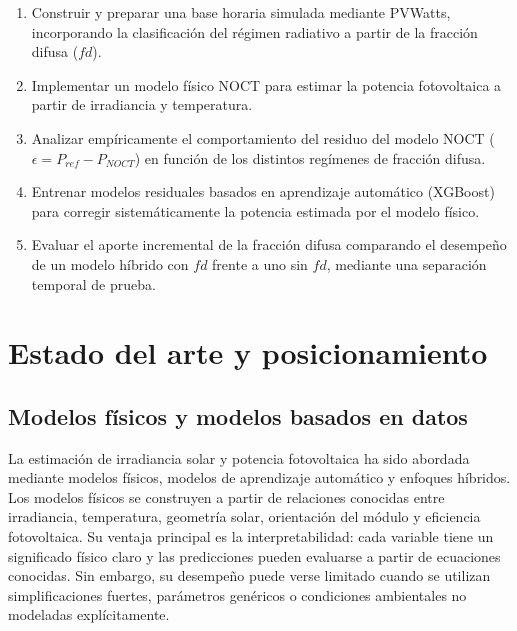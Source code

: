 \documentclass[12pt, letterpaper]{article}
\begin{document}
\begin{enumerate}
    \item Construir y preparar una base horaria simulada mediante PVWatts, incorporando la clasificaci\'on del r\'egimen radiativo a partir de la fracci\'on difusa (\(fd\)).
    \item Implementar un modelo f\'isico NOCT para estimar la potencia fotovoltaica a partir de irradiancia y temperatura.
    \item Analizar emp\'iricamente el comportamiento del residuo del modelo NOCT (\(\epsilon = P_{ref} - P_{NOCT}\)) en funci\'on de los distintos reg\'imenes de fracci\'on difusa.
    \item Entrenar modelos residuales basados en aprendizaje autom\'atico (XGBoost) para corregir sistem\'aticamente la potencia estimada por el modelo f\'isico.
    \item Evaluar el aporte incremental de la fracci\'on difusa comparando el desempe\~no de un modelo h\'ibrido con \(fd\) frente a uno sin \(fd\), mediante una separaci\'on temporal de prueba.
\end{enumerate}


\section{Estado del arte y posicionamiento}

\subsection{Modelos f\'isicos y modelos basados en datos}

La estimaci\'on de irradiancia solar y potencia fotovoltaica ha sido abordada mediante modelos f\'isicos, modelos de aprendizaje autom\'atico y enfoques h\'ibridos. Los modelos f\'isicos se construyen a partir de relaciones conocidas entre irradiancia, temperatura, geometr\'ia solar, orientaci\'on del m\'odulo y eficiencia fotovoltaica. Su ventaja principal es la interpretabilidad: cada variable tiene un significado f\'isico claro y las predicciones pueden evaluarse a partir de ecuaciones conocidas. Sin embargo, su desempe\~no puede verse limitado cuando se utilizan simplificaciones fuertes, par\'ametros gen\'ericos o condiciones ambientales no modeladas expl\'icitamente.
\end{document}

